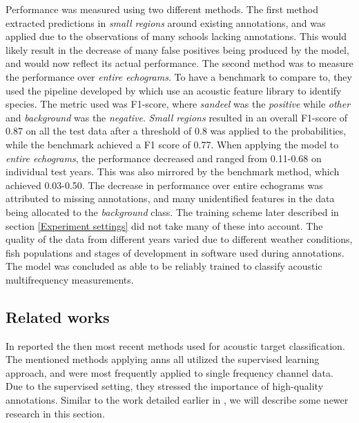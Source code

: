     Performance was measured using two different methods\cite{brautaset2020acoustic}. The first method extracted predictions in \textit{small regions} around existing annotations, and was applied due to  the observations of many schools lacking annotations. This would likely result in the decrease of many false positives being produced by the model, and would now reflect its actual performance. The second method was to measure the performance over \textit{entire echograms}. To have a benchmark to compare to, they used the pipeline developed by \citet{korneliussen2016acoustic} which use an acoustic feature library to identify species. The metric used was F1-score, where \textit{sandeel} was the \textit{positive}   while \textit{other} and \textit{background} was the \textit{negative}. \textit{Small regions} resulted in an overall F1-score of 0.87 on all the test data after a threshold of 0.8 was applied to the probabilities, while the benchmark achieved a F1 score of 0.77. When applying the model to \textit{entire echograms}, the performance decreased and ranged from 0.11-0.68 on individual test years. This was also mirrored by the benchmark method, which achieved 0.03-0.50. The decrease in performance over entire echograms was attributed to missing annotations, and many unidentified features in the data being allocated to the \textit{background} class. The training scheme later described in section \ref{Experiment settings} did not take many of these into account. The quality of the data from different years varied due to different weather conditions, fish populations and stages of development in software used during annotations. The model was concluded as able to be reliably trained to classify acoustic multifrequency measurements\cite{brautaset2020acoustic}.
    
\subsection{Related works}
In \citeyear{korneliussen2018acoustic} \citet{korneliussen2018acoustic} reported the then most recent methods used for acoustic target classification. The mentioned methods applying \gls{ann}s all utilized the supervised learning approach, and were most frequently applied to single frequency channel data. Due to the supervised setting, they stressed the importance of high-quality annotations. Similar to the work detailed earlier in \citet{brautaset2020acoustic}, we will describe some newer research in this section.
   
